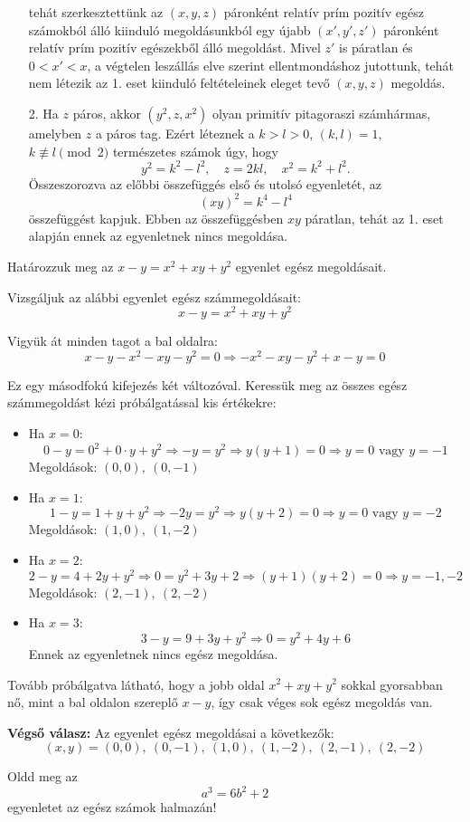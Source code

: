 \begin{solution}
\begin{itemize}
		tehát szerkesztettünk az $(x,y,z)$ páronként relatív prím pozitív
		egész számokból álló kiinduló megoldásunkból egy újabb $(x',y',z')$
		páronként relatív prím pozitív egészekből álló megoldást. Mivel $z'$
		is páratlan és $0<x'<x$, a végtelen leszállás elve szerint ellentmondáshoz
		jutottunk, tehát nem létezik az 1. eset kiinduló feltételeinek eleget
		tevő $(x,y,z)$ megoldás. 
		\item[2.] Ha $z$ páros, akkor $(y^{2},z,x^{2})$ olyan primitív pitagoraszi
		számhármas, amelyben $z$ a páros tag. Ezért léteznek a $k>l>0$,
		$(k,l)=1,$ $k\not\equiv l\pmod 2$ természetes számok úgy, hogy 
		\[
		y^{2}=k^{2}-l^{2},\quad z=2kl,\quad x^{2}=k^{2}+l^{2}.
		\]
		Összeszorozva az előbbi összefüggés első és utolsó egyenletét, az
		\[
		(xy)^{2}=k^{4}-l^{4}
		\]
		összefüggést kapjuk. Ebben az összefüggésben $xy$ páratlan, tehát
		az 1. eset alapján ennek az egyenletnek nincs megoldása. 
	\end{itemize}
\end{solution}
\begin{extraproblem}
	Határozzuk meg az $x-y=x^{2}+xy+y^{2}$ egyenlet egész
	megoldásait. 
\end{extraproblem}

\begin{solution}
	Vizsgáljuk az alábbi egyenlet egész számmegoldásait: 
	\[
	x-y=x^{2}+xy+y^{2}
	\]
	
	Vigyük át minden tagot a bal oldalra: 
	\[
	x-y-x^{2}-xy-y^{2}=0\Rightarrow-x^{2}-xy-y^{2}+x-y=0
	\]
	
	Ez egy másodfokú kifejezés két változóval. Keressük meg az összes
	egész számmegoldást kézi próbálgatással kis értékekre:
	\begin{itemize}
		\item Ha $x=0$: 
		\[
		0-y=0^{2}+0\cdot y+y^{2}\Rightarrow-y=y^{2}\Rightarrow y(y+1)=0\Rightarrow y=0\text{ vagy }y=-1
		\]
		Megoldások: $(0,0),\ (0,-1)$
		\item Ha $x=1$: 
		\[
		1-y=1+y+y^{2}\Rightarrow-2y=y^{2}\Rightarrow y(y+2)=0\Rightarrow y=0\text{ vagy }y=-2
		\]
		Megoldások: $(1,0),\ (1,-2)$
		\item Ha $x=2$: 
		\[
		2-y=4+2y+y^{2}\Rightarrow0=y^{2}+3y+2\Rightarrow(y+1)(y+2)=0\Rightarrow y=-1,-2
		\]
		Megoldások: $(2,-1),\ (2,-2)$
		\item Ha $x=3$: 
		\[
		3-y=9+3y+y^{2}\Rightarrow0=y^{2}+4y+6
		\]
		Ennek az egyenletnek nincs egész megoldása. 
	\end{itemize}
	Tovább próbálgatva látható, hogy a jobb oldal $x^{2}+xy+y^{2}$ sokkal
	gyorsabban nő, mint a bal oldalon szereplő $x-y$, így csak véges
	sok egész megoldás van.
	
	\bigskip{}
	
	\textbf{Végső válasz:} Az egyenlet egész megoldásai a következők:
	\[
	(x,y)=(0,0),\ (0,-1),\ (1,0),\ (1,-2),\ (2,-1),\ (2,-2)
	\]
\end{solution}
\begin{extraproblem}
	Oldd meg az 
	\[
	a^{3}=6b^{2}+2
	\]
	egyenletet az egész számok halmazán! 
\end{extraproblem}

